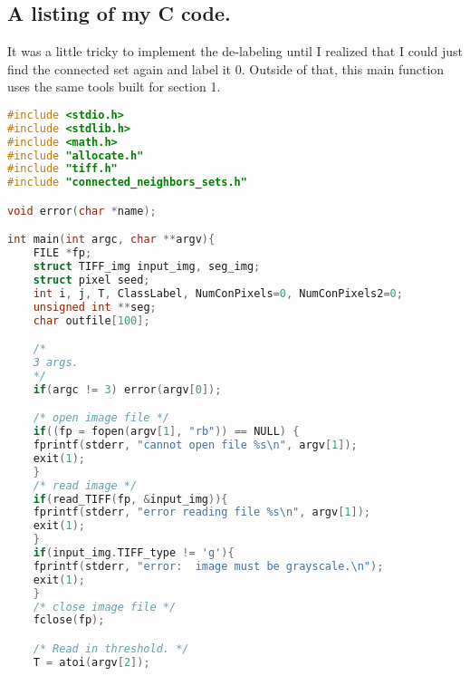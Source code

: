 \documentclass{article}
\begin{document}
\subsection{A listing of my C code.}
It was a little tricky to implement the de-labeling until I realized that I could just find the connected set again and label it 0. Outside of that, this main function uses the same tools built for section 1.
\begin{lstlisting}[language=C, caption=sec\_2.c, label={lst:sec2}]
#include <stdio.h>
#include <stdlib.h>
#include <math.h>
#include "allocate.h"
#include "tiff.h"
#include "connected_neighbors_sets.h"

void error(char *name);

int main(int argc, char **argv){
    FILE *fp;
    struct TIFF_img input_img, seg_img;
    struct pixel seed;
    int i, j, T, ClassLabel, NumConPixels=0, NumConPixels2=0;
    unsigned int **seg;
    char outfile[100];

    /*
    3 args. 
    */
    if(argc != 3) error(argv[0]);

    /* open image file */
    if((fp = fopen(argv[1], "rb")) == NULL) {
    fprintf(stderr, "cannot open file %s\n", argv[1]);
    exit(1);
    }
    /* read image */
    if(read_TIFF(fp, &input_img)){
    fprintf(stderr, "error reading file %s\n", argv[1]);
    exit(1);
    }
    if(input_img.TIFF_type != 'g'){
    fprintf(stderr, "error:  image must be grayscale.\n");
    exit(1);
    }
    /* close image file */
    fclose(fp);

    /* Read in threshold. */
    T = atoi(argv[2]);


\end{lstlisting}
\end{document}
